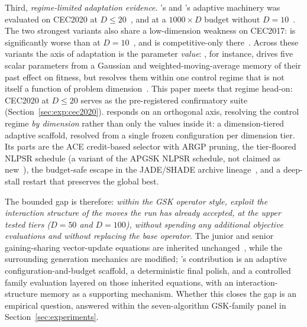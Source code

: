 Third, \emph{regime-limited adaptation evidence}. \agsk{}'s and
\apgsk{}'s adaptive machinery was evaluated on CEC2020 at
$D \leq 20$~\cite{mohamed2020agsk,apgsk2021}, and \fdbagsk{} at a
$1000 \times D$ budget without $D = 10$~\cite{fdbagsk2023}. The two
strongest variants also share a low-dimension weakness on CEC2017: \egsk{} is
significantly worse than \agsk{} at $D = 10$~\cite{jawad2024egsk}, and
\atmals{} is competitive-only there~\cite{alfadli2025atmals}. %
Across these variants the axis of adaptation is the parameter \emph{value}:
\atmals{}, for instance, drives five scalar parameters from a Gaussian and
weighted-moving-average memory of their past effect on fitness, but resolves
them within one control regime that is not itself a function of problem
dimension~\cite{alfadli2025atmals}. This paper meets that regime head-on:
CEC2020 at $D \leq 20$ serves as the pre-registered confirmatory suite
(Section~\ref{sec:exp:cec2020}). \dtgsk{} responds on an orthogonal axis,
resolving the control regime \emph{by dimension} rather than only the values
inside it: a dimension-tiered adaptive scaffold, resolved from a
single frozen configuration per dimension tier. Its parts are the ACE
credit-based selector with ARGP pruning, the tier-floored NLPSR schedule (a
variant of the APGSK NLPSR schedule, not claimed as
new~\cite{apgsk2021}), the budget-safe escape
in the JADE/SHADE archive lineage~\cite{zhang2009jade,tanabe2013shade},
and a deep-stall restart that preserves the global best. %

The bounded gap is therefore: \emph{within the GSK operator style,
exploit the interaction structure of the moves the run has already
accepted, at the upper tested tiers ($D = 50$ and $D = 100$), without spending any additional objective
evaluations and without replacing the base operator}. %
The junior and senior gaining-sharing vector-update equations are inherited
unchanged~\cite{mohamed2020gaining}, while the surrounding generation mechanics
are modified; \dtgsk{}'s contribution is an
adaptive configuration-and-budget scaffold, a deterministic final polish, and a controlled
family evaluation layered on those inherited equations, with an interaction-structure memory
as a supporting mechanism. %
Whether this closes the gap is an empirical question, answered within
the seven-algorithm GSK-family panel in Section~\ref{sec:experiments}.
